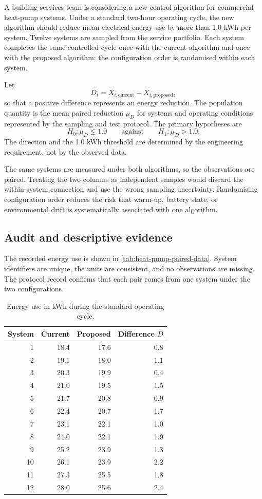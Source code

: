A building-services team is considering a new control algorithm for commercial heat-pump systems. Under a standard two-hour operating cycle, the new algorithm should reduce mean electrical energy use by more than 1.0 kWh per system. Twelve systems are sampled from the service portfolio. Each system completes the same controlled cycle once with the current algorithm and once with the proposed algorithm; the configuration order is randomised within each system.

Let
\[
D_i=X_{i,\mathrm{current}}-X_{i,\mathrm{proposed}},
\]
so that a positive difference represents an energy reduction. The population quantity is the mean paired reduction $\mu_D$ for systems and operating conditions represented by the sampling and test protocol. The primary hypotheses are
\[
H_0:\mu_D\leq 1.0
\qquad\text{against}\qquad
H_1:\mu_D>1.0.
\]
The direction and the 1.0 kWh threshold are determined by the engineering requirement, not by the observed data.

The same systems are measured under both algorithms, so the observations are paired. Treating the two columns as independent samples would discard the within-system connection and use the wrong sampling uncertainty. Randomising configuration order reduces the risk that warm-up, battery state, or environmental drift is systematically associated with one algorithm.

\subsection{Audit and descriptive evidence}

The recorded energy use is shown in \autoref{tab:heat-pump-paired-data}. System identifiers are unique, the units are consistent, and no observations are missing. The protocol record confirms that each pair comes from one system under the two configurations.

\begin{table}[htbp]
\centering
\caption{Energy use in kWh during the standard operating cycle.}
\label{tab:heat-pump-paired-data}
\begin{tabular}{@{}rrrr@{}}
\toprule
System & Current & Proposed & Difference $D$ \\
\midrule
1  & 18.4 & 17.6 & 0.8 \\
2  & 19.1 & 18.0 & 1.1 \\
3  & 20.3 & 19.9 & 0.4 \\
4  & 21.0 & 19.5 & 1.5 \\
5  & 21.7 & 20.8 & 0.9 \\
6  & 22.4 & 20.7 & 1.7 \\
7  & 23.1 & 22.1 & 1.0 \\
8  & 24.0 & 22.1 & 1.9 \\
9  & 25.2 & 23.9 & 1.3 \\
10 & 26.1 & 23.9 & 2.2 \\
11 & 27.3 & 25.5 & 1.8 \\
12 & 28.0 & 25.6 & 2.4 \\
\bottomrule
\end{tabular}
\end{table}

